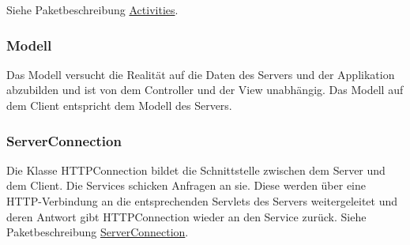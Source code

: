 \begin {center}
\end {center}

Siehe Paketbeschreibung \hyperlink{view}{Activities}.
	\newpage
	\subsubsection{Modell}
Das Modell versucht die Realität auf die Daten des Servers und der Applikation abzubilden und ist von dem Controller und der View unabhängig. 
Das Modell auf dem Client entspricht dem Modell des Servers.

	\subsubsection{ServerConnection}
	Die Klasse HTTPConnection bildet die Schnittstelle zwischen dem Server und dem Client. Die Services schicken Anfragen an sie. Diese werden über eine HTTP-Verbindung an die entsprechenden Servlets des Servers weitergeleitet und deren Antwort gibt HTTPConnection wieder an den Service zurück.
\newline
Siehe Paketbeschreibung \hyperlink{controler.serverConnection}{ServerConnection}.

